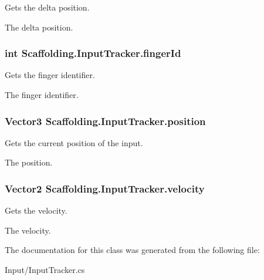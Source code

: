 Gets the delta position. 

The delta position.\hypertarget{class_scaffolding_1_1_input_tracker_a2ea83b7d3578473eaddc1360739b48e7}{
\subsubsection[{finger\-Id}]{\setlength{\rightskip}{0pt plus 5cm}int Scaffolding.\-Input\-Tracker.\-finger\-Id\hspace{0.3cm}{\ttfamily [get]}}}\label{class_scaffolding_1_1_input_tracker_a2ea83b7d3578473eaddc1360739b48e7}


Gets the finger identifier. 

The finger identifier.\hypertarget{class_scaffolding_1_1_input_tracker_ab29b6a8291f5f49035544a3c6e592be0}{
\subsubsection[{position}]{\setlength{\rightskip}{0pt plus 5cm}Vector3 Scaffolding.\-Input\-Tracker.\-position\hspace{0.3cm}{\ttfamily [get]}}}\label{class_scaffolding_1_1_input_tracker_ab29b6a8291f5f49035544a3c6e592be0}


Gets the current position of the input. 

The position.\hypertarget{class_scaffolding_1_1_input_tracker_a1cca0ea0d1202267e88f7a88f511d2c5}{
\subsubsection[{velocity}]{\setlength{\rightskip}{0pt plus 5cm}Vector2 Scaffolding.\-Input\-Tracker.\-velocity\hspace{0.3cm}{\ttfamily [get]}}}\label{class_scaffolding_1_1_input_tracker_a1cca0ea0d1202267e88f7a88f511d2c5}


Gets the velocity. 

The velocity.

The documentation for this class was generated from the following file\-:\begin{DoxyCompactItemize}
\item 
Input/Input\-Tracker.\-cs\end{DoxyCompactItemize}
